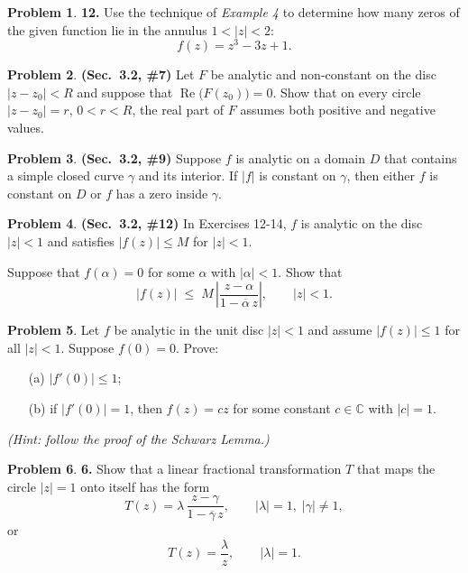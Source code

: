 \documentclass[10pt]{article}
\theoremstyle{definition} %
\newtheorem{problem}{Problem}
\theoremstyle{plain} %
\begin{document}
  \begin{problem}
  \textbf{12.} Use the technique of \emph{Example 4} to determine how many zeros of the given function lie in the annulus \(1<|z|<2\):
  \[
    f(z)=z^{3}-3z+1.
  \]
  \end{problem}
  \begin{problem}
    \textbf{(Sec.\ 3.2, \#7)}  
    Let \(F\) be analytic and non‑constant on the disc \(\lvert z-z_0\rvert < R\) and suppose that \(\operatorname{Re}\bigl(F(z_0)\bigr)=0\).
    Show that on every circle \(\lvert z-z_0\rvert = r\), \(0<r<R\), the real part of \(F\) assumes both positive and negative values.
    \end{problem}
    
    \begin{problem}
    \textbf{(Sec.\ 3.2, \#9)}  
    Suppose \(f\) is analytic on a domain \(D\) that contains a simple closed curve \(\gamma\) and its interior.
    If \(\lvert f\rvert\) is constant on \(\gamma\), then either \(f\) is constant on \(D\) or \(f\) has a zero inside \(\gamma\).
    \end{problem}
    
    \begin{problem}
    \textbf{(Sec.\ 3.2, \#12)}  
    In Exercises 12-14, \(f\) is analytic on the disc \(\lvert z\rvert<1\) and satisfies \(\lvert f(z)\rvert\le M\) for \(\lvert z\rvert<1\).
    
    Suppose that \(f(\alpha)=0\) for some \(\alpha\) with \(\lvert\alpha\rvert<1\).
    Show that
    \[
      \lvert f(z)\rvert \;\le\; M\,
      \left\lvert \frac{z-\alpha}{1-\overline{\alpha}\,z} \right\rvert,
      \qquad \lvert z\rvert<1.
    \]
    \end{problem}
    
    \begin{problem}
    Let \(f\) be analytic in the unit disc \(\lvert z\rvert<1\) and assume \(\lvert f(z)\rvert\le 1\) for all \(\lvert z\rvert<1\).
    Suppose \(f(0)=0\).  Prove:
    \begin{enumerate}\itemsep6pt
      \item[(a)] \(\lvert f'(0)\rvert \le 1\);
      \item[(b)] if \(\lvert f'(0)\rvert = 1\), then \(f(z)=cz\) for some constant \(c\in\mathbb{C}\) with \(\lvert c\rvert = 1\).
    \end{enumerate}
    \emph{(Hint: follow the proof of the Schwarz Lemma.)}
    \end{problem}
    \begin{problem}
      \textbf{6.} Show that a linear fractional transformation \(T\) that maps the circle \(\lvert z\rvert = 1\) onto itself has the form
      \[
        T(z)=\lambda\,\frac{z-\gamma}{1-\overline{\gamma}\,z},
        \qquad \lvert\lambda\rvert = 1,\; \lvert\gamma\rvert \neq 1,
      \]
      or
      \[
        T(z)=\frac{\lambda}{z},
        \qquad \lvert\lambda\rvert = 1.
      \]
      \end{problem}
      
\end{document}
